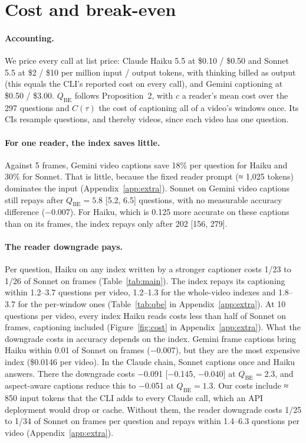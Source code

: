 \documentclass[11pt]{article}
\newcommand{\qbe}{\ensuremath{Q_{\mathrm{BE}}}}
\begin{document}
\section{Cost and break-even}
\label{sec:cost}

\paragraph{Accounting.} We price every call at list price: Claude Haiku 5.5 at \$0.10 / \$0.50 and Sonnet 5.5 at \$2 / \$10 per million input / output tokens, with thinking billed as output (this equals the CLI's reported cost on every call), and Gemini captioning at \$0.50 / \$3.00. \qbe{} follows Proposition~2, with $c$ a reader's mean cost over the 297 questions and $C(\tau)$ the cost of captioning all of a video's windows once. Its CIs resample questions, and thereby videos, since each video has one question.

\paragraph{For one reader, the index saves little.} Against 5 frames, Gemini video captions save 18\% per question for Haiku and 30\% for Sonnet. That is little, because the fixed reader prompt (≈ 1,025 tokens) dominates the input (Appendix~\ref{app:extra}). Sonnet on Gemini video captions still repays after $\qbe = 5.8$ [5.2, 6.5] questions, with no measurable accuracy difference (−0.007). For Haiku, which is 0.125 more accurate on these captions than on its frames, the index repays only after 202 [156, 279].

\paragraph{The reader downgrade pays.} Per question, Haiku on any index written by a stronger captioner costs 1/23 to 1/26 of Sonnet on frames (Table~\ref{tab:main}). The index repays its captioning within 1.2--3.7 questions per video, 1.2--1.3 for the whole-video indexes and 1.8--3.7 for the per-window ones (Table~\ref{tab:qbe} in Appendix~\ref{app:extra}). At 10 questions per video, every index Haiku reads costs less than half of Sonnet on frames, captioning included (Figure~\ref{fig:cost} in Appendix~\ref{app:extra}). What the downgrade costs in accuracy depends on the index. Gemini frame captions bring Haiku within 0.01 of Sonnet on frames (−0.007), but they are the most expensive index (\$0.0146 per video). In the Claude chain, Sonnet captions once and Haiku answers. There the downgrade costs −0.091 [−0.145, −0.040] at $\qbe = 2.3$, and aspect-aware captions reduce this to −0.051 at $\qbe = 1.3$. Our costs include ≈ 850 input tokens that the CLI adds to every Claude call, which an API deployment would drop or cache. Without them, the reader downgrade costs 1/25 to 1/34 of Sonnet on frames per question and repays within 1.4--6.3 questions per video (Appendix~\ref{app:extra}).
\end{document}
